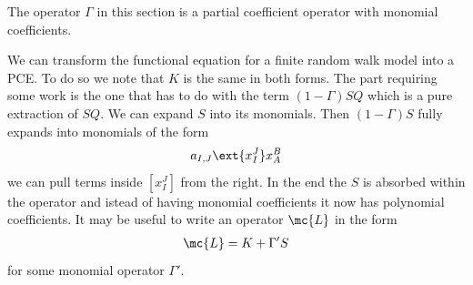 \begin{example} The operator $\Gamma$ in this section is a partial coefficient operator with monomial coefficients.
\end{example}

\begin{example} We can transform the functional equation for a finite random walk model into a PCE. To do so we note that $K$ is the same in both forms. The part requiring some work is the one that has to do with the term $(1-\Gamma)SQ$ which is a pure extraction of $SQ$. We can expand $S$ into its monomials. Then $(1-\Gamma)S$ fully expands into monomials of the form
\begin{align}
	a_{I,J}\ext{x_I^J}x_A^B
\end{align}
we can pull terms inside $[x_I^J]$ from the right. In the end the $S$ is absorbed within the operator and istead of having monomial coefficients it now has polynomial coefficients. It may be useful to write an operator $\mc{L}$ in the form
\begin{align}
	\mc{L} = K + \Gamma'S
\end{align}
for some monomial operator $\Gamma'$.
\end{example}

